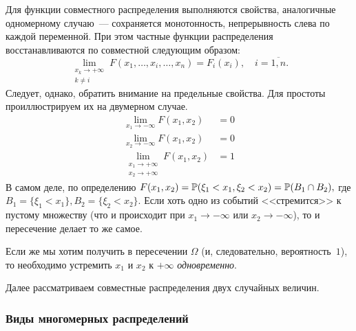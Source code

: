 \begin{rmrk}
    Для функции совместного распределения выполняются свойства, аналогичные одномерному случаю~--- сохраняется монотонность, непрерывность слева по каждой переменной.
    При этом частные функции распределения восстанавливаются по совместной следующим образом:
    \begin{equation*}
        \lim\limits_{\substack{x_{k} \to +\infty \\ k \neq i}}  F(x_{1}, \ldots, x_{i}, \ldots, x_{n}) = F_{i}(x_i), \quad i = \overline{1,n}.
    \end{equation*}
    Следует, однако, обратить внимание на предельные свойства. 
    Для простоты проиллюстрируем их на двумерном случае.
    \begin{align*}
        \lim\limits_{x_1 \to -\infty} F(x_1, x_2) & = 0 \\
        \lim\limits_{x_2 \to -\infty} F(x_1, x_2) & = 0 \\
        \lim_{
            \substack{
                x_1 \to +\infty \\ 
                x_2 \to +\infty
            }
        } F(x_1, x_2) & = 1
    \end{align*}
    В самом деле, по определению $F(x_1, x_2) = \operatorname{\mathbb{P}}(\xi_1 < x_1, \xi_2 < x_2) = \operatorname{\mathbb{P}}(B_1 \cap B_2),$ 
    где $B_1 = \{\xi_1 < x_1\}, B_2 = \{\xi_2 < x_2\}$. 
    Если хоть одно из событий <<стремится>> к пустому множеству (что и происходит при $x_1 \to -\infty$ или $x_2 \to -\infty$), 
    то и пересечение делает то же самое.

    Если же мы хотим получить в пересечении $\Omega$ (и, следовательно, вероятность~$1$), то необходимо устремить $x_1$ и $x_2$ к $+\infty$ \textit{одновременно}.
\end{rmrk}

Далее рассматриваем совместные распределения двух случайных величин.

\subsubsection{Виды многомерных распределений}

